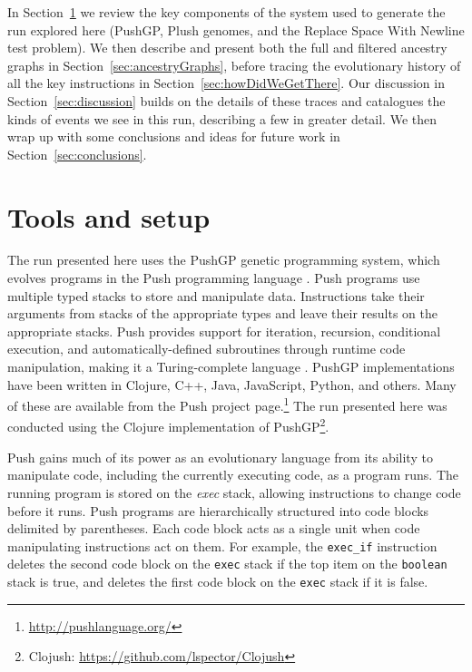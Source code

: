 In Section~\ref{sec:background} we review the key components of the system
used to generate the run explored here (PushGP, Plush genomes, and the Replace Space With Newline test problem). We then describe and present both the full
and filtered ancestry graphs in Section~\ref{sec:ancestryGraphs}, before
tracing the evolutionary history of all the key instructions in 
Section~\ref{sec:howDidWeGetThere}. Our discussion in 
Section~\ref{sec:discussion} builds on the details of these traces and
catalogues the kinds of events we see in this run, describing a few in greater
detail. We then wrap up with some conclusions and ideas for future work in
Section~\ref{sec:conclusions}.

\section{Tools and setup}
\label{sec:background}

The run presented here uses the PushGP genetic programming system, which evolves programs in the Push programming language \citep{spector:2002:GPEM, 1068292}. Push programs use multiple typed stacks to store and manipulate data. Instructions take their arguments from stacks of the appropriate types and leave their results on the appropriate stacks. Push provides support for iteration, recursion, conditional execution, and automatically-defined subroutines through runtime code manipulation, making it a Turing-complete language \citep{1068292}. PushGP implementations have been written in Clojure, C++, Java, JavaScript, Python, and others. Many of these are available from the Push project page.\footnote{\url{http://pushlanguage.org/}} The run presented here was conducted using the Clojure implementation of PushGP\footnote{Clojush: \url{https://github.com/lspector/Clojush}}.

Push gains much of its power as an evolutionary language from its ability to manipulate code, including the currently executing code, as a program runs. The running program is stored on the \textit{exec} stack, allowing instructions to change code before it runs. Push programs are hierarchically structured into code blocks delimited by parentheses. Each code block acts as a single unit when code manipulating instructions act on them. For example, the \texttt{exec\_if} instruction deletes the second code block on the \texttt{exec} stack if the top item on the \texttt{boolean} stack is true, and deletes the first code block on the \texttt{exec} stack if it is false.

